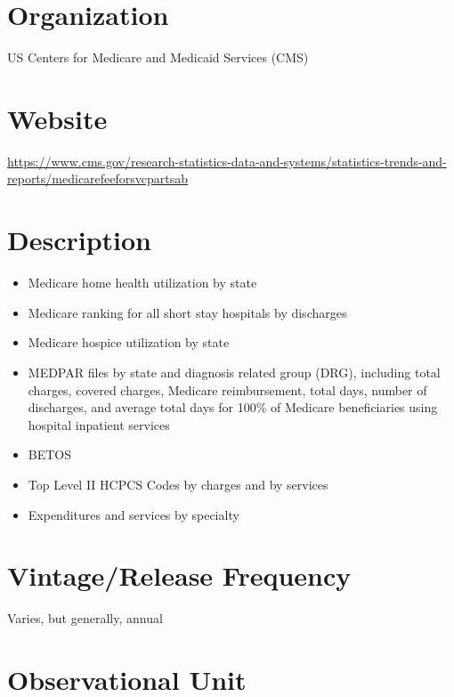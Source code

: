 \documentclass[
]{book}
\providecommand{\tightlist}{%
  \setlength{\itemsep}{0pt}\setlength{\parskip}{0pt}}
\begin{document}
\hypertarget{organization-38}{%
\section{Organization}\label{organization-38}}

US Centers for Medicare and Medicaid Services (CMS)

\hypertarget{website-38}{%
\section{Website}\label{website-38}}

\url{https://www.cms.gov/research-statistics-data-and-systems/statistics-trends-and-reports/medicarefeeforsvcpartsab}

\hypertarget{description-38}{%
\section{Description}\label{description-38}}

\begin{itemize}
\tightlist
\item
  Medicare home health utilization by state
\item
  Medicare ranking for all short stay hospitals by discharges
\item
  Medicare hospice utilization by state
\item
  MEDPAR files by state and diagnosis related group (DRG), including total charges, covered charges, Medicare reimbursement, total days, number of discharges, and average total days for 100\% of Medicare beneficiaries using hospital inpatient services
\item
  BETOS
\item
  Top Level II HCPCS Codes by charges and by services
\item
  Expenditures and services by specialty
\end{itemize}

\hypertarget{vintagerelease-frequency-38}{%
\section{Vintage/Release Frequency}\label{vintagerelease-frequency-38}}

Varies, but generally, annual

\hypertarget{observational-unit-38}{%
\section{Observational Unit}\label{observational-unit-38}}
\end{document}
